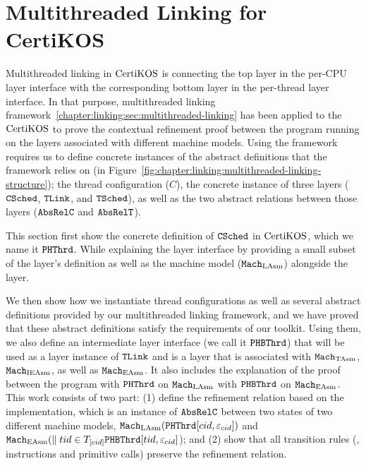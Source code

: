\section{Multithreaded Linking for CertiKOS}
\label{chapter:certikos:sec:multithreaded-linking-for-certikos}


Multithreaded linking in $\mathrm{CertiKOS}$ is connecting the top layer in the per-CPU layer interface with
the corresponding bottom layer in the per-thread layer interface. 
In that purpose, multithreaded linking framework~\ref{chapter:linking:sec:multithreaded-linking} 
has been applied to the $\mathrm{CertiKOS}$ to prove the contextual refinement proof between the program running on the layers associated with different machine models.
Using the framework requires us to define concrete instances 
of the abstract definitions that the framework relies on (in Figure~\ref{fig:chapter:linking:multithreaded-linking-structure});
the thread configuration ($C$), the concrete instance of three layers (${{\mathrm{\texttt{CSched}}}}$, ${{\mathrm{\texttt{TLink}}}}$, and ${{\mathrm{\texttt{TSched}}}}$), 
as well as the two abstract relations between those layers (${\mathrm{\texttt{AbsRelC}}}$ and ${\mathrm{\texttt{AbsRelT}}}$). 

This section first show the concrete definition of ${{\mathrm{\texttt{CSched}}}}$ in $\mathrm{CertiKOS}$, which we name it ${\mathrm{\texttt{PHThrd}}}$. 
While explaining the layer interface by providing a small subset of the layer's definition as well as the machine model (${\mathrm{\texttt{Mach}}}_{\mathrm{LAsm}}$)
alongside the layer.

We then show how we instantiate thread configurations as well as several abstract definitions provided by our multithreaded linking framework, and we have proved that these abstract definitions satisfy the requirements of our toolkit.
Using them, we also define an intermediate layer interface (we call it ${\mathrm{\texttt{PHBThrd}}}$) that will be used as a layer instance of ${{\mathrm{\texttt{TLink}}}}$ and is a layer that is associated with ${\mathrm{\texttt{Mach}}}_{\mathrm{TAsm}}$, ${\mathrm{\texttt{Mach}}}_{\mathrm{IEAsm}}$, as well as ${\mathrm{\texttt{Mach}}}_{\mathrm{EAsm}}$.
It also includes  the explanation of the proof between the program with  ${\mathrm{\texttt{PHThrd}}}$ on ${\mathrm{\texttt{Mach}}}_{\mathrm{LAsm}}$ 
with ${\mathrm{\texttt{PHBThrd}}}$ on ${\mathrm{\texttt{Mach}}}_{\mathrm{EAsm}}$. 
This work consists of two part:  (1) define the refinement relation based on the implementation, which is an instance of ${\mathrm{\texttt{AbsRelC}}}$ between two states of two different machine models,
${\mathrm{\texttt{Mach}}}_{\mathrm{LAsm}}({\mathrm{\texttt{PHThrd}}}[cid, {\varepsilon}_{cid}])$ and 
${\mathrm{\texttt{Mach}}}_{\mathrm{EAsm}}(\parallel tid \in T_{[cid]} {\mathrm{\texttt{PHBThrd}}}[tid, {\varepsilon}_{cid}]$); and 
(2) show that all transition rules (\ie, instructions and primitive calls) preserve the refinement relation. 

